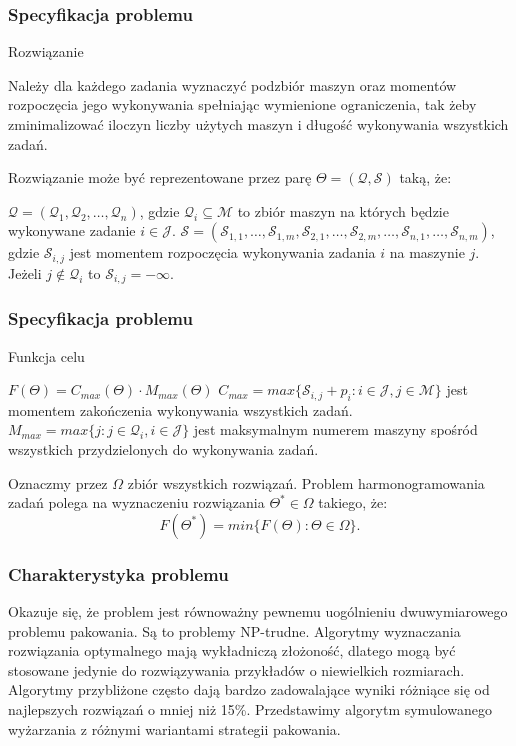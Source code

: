 \documentclass{beamer}
\begin{document}
\begin{frame}
    \frametitle{Specyfikacja problemu}
    Rozwiązanie
    \begin{outline}
        \1 Należy dla każdego zadania wyznaczyć podzbiór maszyn oraz momentów rozpoczęcia jego wykonywania spełniając wymienione ograniczenia, tak żeby zminimalizować iloczyn liczby
        użytych maszyn i długość wykonywania wszystkich zadań.
    \end{outline}
    
    
    Rozwiązanie może być reprezentowane przez parę $\Theta=(\mathcal{Q},\mathcal{S})$ taką, że:
    \begin{outline}
        \1 $\mathcal{Q}=(\mathcal{Q}_1,\mathcal{Q}_2,\dots,\mathcal{Q}_n)$, gdzie 
        $\mathcal{Q}_i \subseteq \mathcal{M}$
        to zbiór maszyn na których będzie wykonywane zadanie $i\in\mathcal{J}$.
        \1 $\mathcal{S}=(\mathcal{S}_{1,1},\dots,\mathcal{S}_{1,m},\mathcal{S}_{2,1},
        \dots,\mathcal{S}_{2,m},\dots,\mathcal{S}_{n,1},\dots,\mathcal{S}_{n,m})$, gdzie
        $\mathcal{S}_{i,j}$ jest momentem rozpoczęcia wykonywania zadania $i$ na maszynie $j$.
        Jeżeli $j\notin\mathcal{Q}_i$ to $\mathcal{S}_{i,j}=-\infty$.
    \end{outline}
    
\end{frame}

\begin{frame}
    \frametitle{Specyfikacja problemu}
    Funkcja celu
    \begin{outline}
        \1 $F(\Theta)=C_{max}(\Theta)\cdot M_{max}(\Theta)$
        \1 $C_{max}=max\{\mathcal{S}_{i,j}+p_i: i\in\mathcal{J}, j\in\mathcal{M}\}$
        jest momentem zakończenia wykonywania wszystkich zadań.
        \1 $M_{max}=max\{j:j\in\mathcal{Q}_i,i\in\mathcal{J}\}$
        jest maksymalnym numerem maszyny spośród wszystkich przydzielonych 
        do wykonywania zadań.
    \end{outline}
    
    Oznaczmy przez $\Omega$ zbiór wszystkich rozwiązań.
    Problem harmonogramowania zadań polega na wyznaczeniu rozwiązania $\Theta^*\in\Omega$
    takiego, że:
    $$F(\Theta^*)=min\{F(\Theta):\Theta\in\Omega\}.$$
\end{frame}

\begin{frame}
    \frametitle{Charakterystyka problemu}
    \begin{outline}
        \1 Okazuje się, że problem jest równoważny pewnemu uogólnieniu dwuwymiarowego
        problemu pakowania.
        \1 Są to problemy NP-trudne. Algorytmy wyznaczania rozwiązania optymalnego mają wykładniczą
        złożoność, dlatego mogą być stosowane jedynie do rozwiązywania przykładów o niewielkich rozmiarach.
        \1 Algorytmy przybliżone często dają bardzo zadowalające wyniki różniące się od najlepszych rozwiązań o mniej niż 15\%.
        \1 Przedstawimy algorytm symulowanego wyżarzania z różnymi wariantami strategii
        pakowania.
    \end{outline}
\end{frame}
\end{document}
